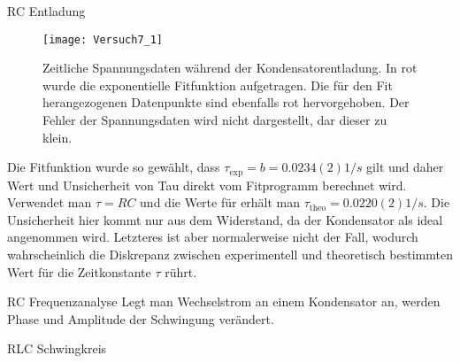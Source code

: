 \documentclass{alex_gp}
\begin{document}
\begin{mybox}{RC Entladung}
	\begin{figure}[H]	
		\centering
		\texttt{[image: Versuch7\_1]}
		\caption{Zeitliche Spannungsdaten während der Kondensatorentladung. In rot wurde die exponentielle Fitfunktion aufgetragen. Die für den Fit herangezogenen Datenpunkte sind ebenfalls rot hervorgehoben. Der Fehler der Spannungsdaten wird nicht dargestellt, dar dieser zu klein.}
		\label{fig:ExpFit}
	\end{figure}

	Die Fitfunktion wurde so gewählt, dass \( \tau_{\text{exp}} = b = 0.0234(2) \unit{1/s} \) gilt und daher Wert und Unsicherheit von Tau direkt vom Fitprogramm berechnet wird. Verwendet man \( \tau = RC \) und die Werte für 
	erhält man \( \tau_{\text{theo}} = 0.0220(2) \unit{1/s} \). Die Unsicherheit hier kommt nur aus dem Widerstand, da der Kondensator als ideal angenommen wird. Letzteres ist aber normalerweise nicht der Fall, wodurch wahrscheinlich die Diskrepanz zwischen experimentell und theoretisch bestimmten Wert für die Zeitkonstante \( \tau \) rührt.
\end{mybox}

\begin{mybox}{RC Frequenzanalyse}
	Legt man Wechselstrom an einem Kondensator an, werden Phase und Amplitude der Schwingung verändert. 
\end{mybox}

\begin{mybox}{RLC Schwingkreis}

\end{mybox}
\end{document}
